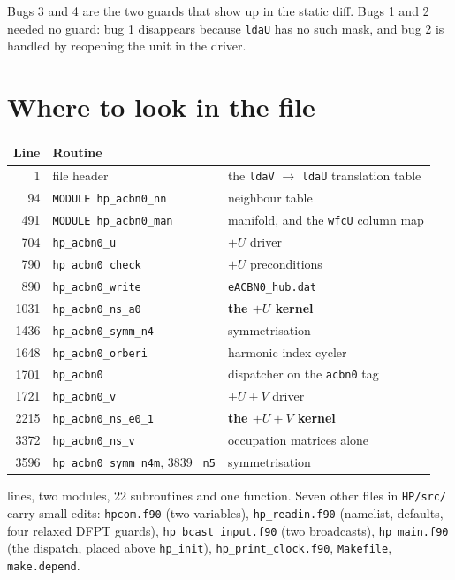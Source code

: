 \documentclass[11pt,a4paper]{article}
\newcommand{\C}[1]{\texttt{\small #1}}
\begin{document}
\noindent
Bugs 3 and 4 are the two guards that show up in the static diff. Bugs 1 and 2
needed no guard: bug 1 disappears because \C{ldaU} has no such mask, and bug 2
is handled by reopening the unit in the driver.

\section{Where to look in the file}

\begin{center}\small
\begin{tabular}{rll}
\toprule
Line & Routine & \\
\midrule
   1 & file header & the \C{ldaV} $\rightarrow$ \C{ldaU} translation table \\
  94 & \C{MODULE hp_acbn0_nn} & neighbour table \\
 491 & \C{MODULE hp_acbn0_man} & manifold, and the \C{wfcU} column map \\
 704 & \C{hp_acbn0_u} & $+U$ driver \\
 790 & \C{hp_acbn0_check} & $+U$ preconditions \\
 890 & \C{hp_acbn0_write} & \C{eACBN0_hub.dat} \\
1031 & \C{hp_acbn0_ns_a0} & \textbf{the $+U$ kernel} \\
1436 & \C{hp_acbn0_symm_n4} & symmetrisation \\
1648 & \C{hp_acbn0_orberi} & harmonic index cycler \\
1701 & \C{hp_acbn0} & dispatcher on the \C{acbn0} tag \\
1721 & \C{hp_acbn0_v} & $+U+V$ driver \\
2215 & \C{hp_acbn0_ns_e0_1} & \textbf{the $+U+V$ kernel} \\
3372 & \C{hp_acbn0_ns_v} & occupation matrices alone \\
3596 & \C{hp_acbn0_symm_n4m}, 3839 \C{_n5} & symmetrisation \\
\bottomrule
\end{tabular}
\end{center}

 lines, two modules, 22 subroutines and one function. Seven other files in
\C{HP/src/} carry small edits: \C{hpcom.f90} (two variables),
\C{hp_readin.f90} (namelist, defaults, four relaxed DFPT guards),
\C{hp_bcast_input.f90} (two broadcasts), \C{hp_main.f90} (the dispatch, placed
above \C{hp_init}), \C{hp_print_clock.f90}, \C{Makefile}, \C{make.depend}.
\end{document}
